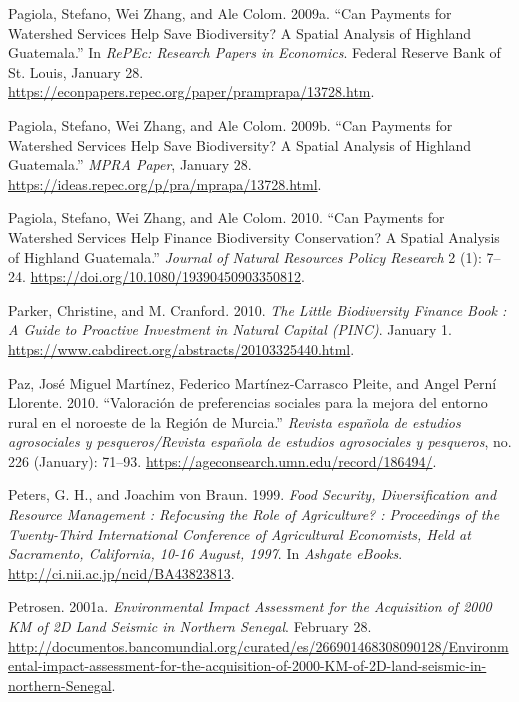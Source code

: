 \begin{CSLReferences}{1}{1}
Pagiola, Stefano, Wei Zhang, and Ale Colom. 2009a. {``Can Payments for
Watershed Services Help Save Biodiversity? A Spatial Analysis of
Highland Guatemala.''} In \emph{RePEc: Research Papers in Economics}.
Federal Reserve Bank of St. Louis, January 28.
\url{https://econpapers.repec.org/paper/pramprapa/13728.htm}.

Pagiola, Stefano, Wei Zhang, and Ale Colom. 2009b. {``Can Payments for
Watershed Services Help Save Biodiversity? A Spatial Analysis of
Highland Guatemala.''} \emph{MPRA Paper}, January 28.
\url{https://ideas.repec.org/p/pra/mprapa/13728.html}.

Pagiola, Stefano, Wei Zhang, and Ale Colom. 2010. {``Can Payments for
Watershed Services Help Finance Biodiversity Conservation? A Spatial
Analysis of Highland Guatemala.''} \emph{Journal of Natural Resources
Policy Research} 2 (1): 7--24.
\url{https://doi.org/10.1080/19390450903350812}.

Parker, Christine, and M. Cranford. 2010. \emph{The Little Biodiversity
Finance Book : A Guide to Proactive Investment in Natural Capital
(PINC)}. January 1.
\url{https://www.cabdirect.org/abstracts/20103325440.html}.

Paz, José Miguel Martínez, Federico Martínez‐Carrasco Pleite, and Angel
Perní Llorente. 2010. {``Valoración de preferencias sociales para la
mejora del entorno rural en el noroeste de la Región de Murcia.''}
\emph{Revista española de estudios agrosociales y pesqueros/Revista
española de estudios agrosociales y pesqueros}, no. 226 (January):
71--93. \url{https://ageconsearch.umn.edu/record/186494/}.

Peters, G. H., and Joachim von Braun. 1999. \emph{Food Security,
Diversification and Resource Management : Refocusing the Role of
Agriculture? : Proceedings of the Twenty-Third International Conference
of Agricultural Economists, Held at Sacramento, California, 10-16
August, 1997}. In \emph{Ashgate eBooks}.
\url{http://ci.nii.ac.jp/ncid/BA43823813}.

Petrosen. 2001a. \emph{Environmental Impact Assessment for the
Acquisition of 2000 KM of 2D Land Seismic in Northern Senegal}. February
28.
\url{http://documentos.bancomundial.org/curated/es/266901468308090128/Environmental-impact-assessment-for-the-acquisition-of-2000-KM-of-2D-land-seismic-in-northern-Senegal}.


\end{CSLReferences}

